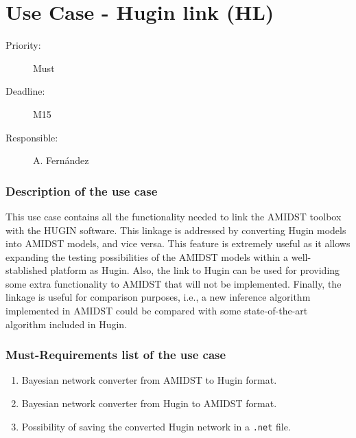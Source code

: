 \newpage
\section{Use Case - Hugin link (HL)}
\label{UseCase:HL}

\begin{description}
\item[Priority:] Must
\item[Deadline:] M15
\item[Responsible:] A. Fern\'andez
\end{description}

\subsubsection*{Description of the use case}

This use case contains all the functionality needed to link the AMIDST toolbox with the HUGIN software. This linkage is addressed by converting Hugin models into AMIDST models, and vice versa. This feature is extremely useful as it allows expanding the testing possibilities of the AMIDST models within a well-stablished platform as Hugin. Also, the link to Hugin can be used for providing some extra functionality to AMIDST that will not be implemented. Finally, the linkage is useful for comparison purposes, i.e., a new inference algorithm implemented in AMIDST could be compared with some state-of-the-art algorithm included in Hugin.

\subsubsection*{Must-Requirements list of the use case}

\begin{enumerate}
\item Bayesian network converter from AMIDST to Hugin format. 
\item Bayesian network converter from Hugin to AMIDST format.
\item Possibility of saving the converted Hugin network in a \texttt{.net} file.
\end{enumerate}

